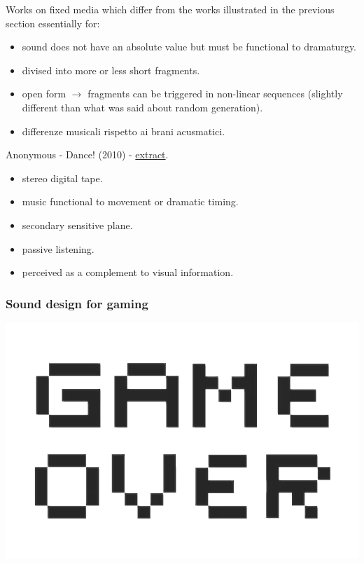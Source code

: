 Works on fixed media which differ from the works illustrated in the previous section essentially for:

\begin{itemize}
\tightlist
\item sound does not have an absolute value but must be functional to dramaturgy.
\item divised into more or less short fragments.
\item open form \(\rightarrow\) fragments can be triggered in non-linear sequences (slightly different than what was said about random generation).
\item differenze musicali rispetto ai brani acusmatici.
\end{itemize}

Anonymous - Dance! (2010) - \href{https://github.com/musicaecodice/EMC/blob/main/2_instruments/suoni/dance.mp3}{extract}.

\begin{itemize}
\tightlist 
\item stereo digital tape. 
\item music functional to movement or dramatic timing.
\item secondary sensitive plane. 
\item passive listening. 
\item perceived as a complement to visual information.
\end{itemize}

\subsubsection{Sound design for gaming}\label{sound-design-for-gaming}

\begin{center}
\includegraphics[scale=0.3]{../img/game.png}
\end{center}

